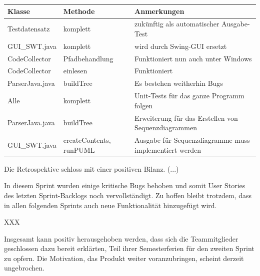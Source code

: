 \begin{table}[H]

\begin{tabularx}{\textwidth}{ |l|l|X| }
\hline
\textbf{Klasse} & \textbf{Methode} & \textbf{Anmerkungen}\\
 \hline
 
 Testdatensatz & komplett & zukünftig als automatischer Ausgabe-Test\\ \hline
 GUI\_SWT.java & komplett & wird durch Swing-GUI ersetzt\\ \hline
 CodeCollector & Pfadbehandlung & Funktioniert nun auch unter Windows\\ \hline
 CodeCollector & einlesen & Funktioniert\\ \hline
 ParserJava.java & buildTree & Es bestehen weitherhin Bugs\\ \hline
 Alle & komplett & Unit-Tests für das ganze Programm folgen\\ \hline
 ParserJava.java & buildTree & Erweiterung für das Erstellen von Sequenzdiagrammen\\ \hline
 GUI\_SWT.java & createContents, runPUML & Ausgabe für Sequenzdiagramme muss implementiert werden\\ \hline
 
\hline
\end{tabularx}
\end{table}

\nsecend%

Die Retrospektive schloss mit einer positiven Bilanz. (...)
\nsecend%

In diesem Sprint wurden einige kritische Bugs behoben und somit User Stories des letzten Sprint-Backlogs noch vervollständigt. Zu hoffen bleibt trotzdem, dass in allen folgenden Sprints auch neue Funktionalität hinzugefügt wird.
\nsecend%

XXX
\nsecend%

Insgesamt kann positiv herausgehoben werden, dass sich die Teammitglieder geschlossen dazu bereit erklärten, Teil ihrer Semesterferien für den zweiten Sprint zu opfern. Die Motivation, das Produkt weiter voranzubringen, scheint derzeit ungebrochen.
\nsecend%